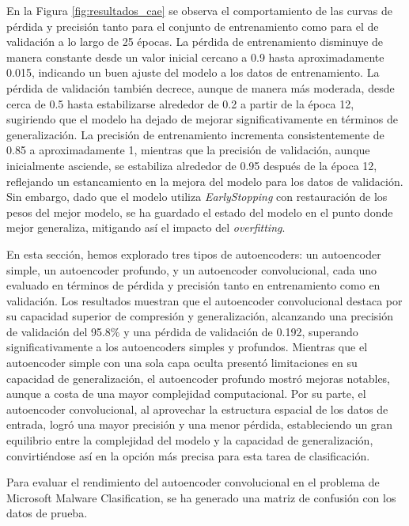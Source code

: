 En la Figura \ref{fig:resultados_cae} se observa el comportamiento de las curvas de pérdida y precisión tanto para el conjunto de entrenamiento como para el de validación a lo largo de 25 épocas. La pérdida de entrenamiento disminuye de manera constante desde un valor inicial cercano a 0.9 hasta aproximadamente 0.015, indicando un buen ajuste del modelo a los datos de entrenamiento. La pérdida de validación también decrece, aunque de manera más moderada, desde cerca de 0.5 hasta estabilizarse alrededor de 0.2 a partir de la época 12, sugiriendo que el modelo ha dejado de mejorar significativamente en términos de generalización. La precisión de entrenamiento incrementa consistentemente de 0.85 a aproximadamente 1, mientras que la precisión de validación, aunque inicialmente asciende, se estabiliza alrededor de 0.95 después de la época 12, reflejando un estancamiento en la mejora del modelo para los datos de validación. Sin embargo, dado que el modelo utiliza \textit{EarlyStopping} con restauración de los pesos del mejor modelo, se ha guardado el estado del modelo en el punto donde mejor generaliza, mitigando así el impacto del \textit{overfitting}.


En esta sección, hemos explorado tres tipos de autoencoders: un autoencoder simple, un autoencoder profundo, y un autoencoder convolucional, cada uno evaluado en términos de pérdida y precisión tanto en entrenamiento como en validación. Los resultados muestran que el autoencoder convolucional destaca por su capacidad superior de compresión y generalización, alcanzando una precisión de validación del 95.8\% y una pérdida de validación de 0.192, superando significativamente a los autoencoders simples y profundos. Mientras que el autoencoder simple con una sola capa oculta presentó limitaciones en su capacidad de generalización, el autoencoder profundo mostró mejoras notables, aunque a costa de una mayor complejidad computacional. Por su parte, el autoencoder convolucional, al aprovechar la estructura espacial de los datos de entrada, logró una mayor precisión y una menor pérdida, estableciendo un gran equilibrio entre la complejidad del modelo y la capacidad de generalización, convirtiéndose así en la opción más precisa para esta tarea de clasificación.


Para evaluar el rendimiento del autoencoder convolucional en el problema de Microsoft Malware Clasification, se ha generado una matriz de confusión con los datos de prueba. 


